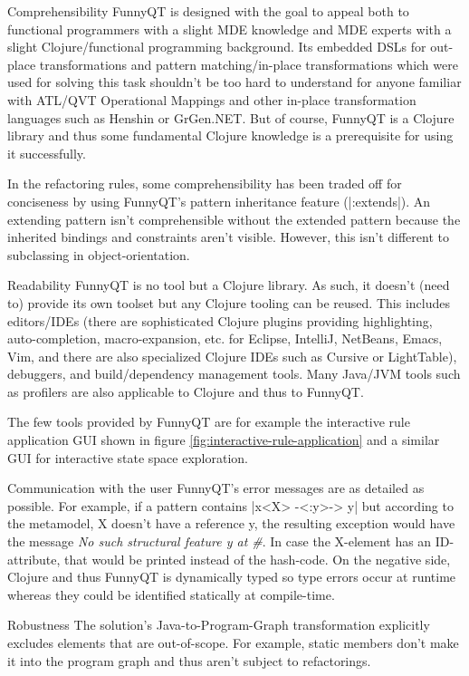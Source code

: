 \documentclass[submission]{eptcs}
\newcommand{\code}{\clojureinline}
\begin{document}
\begin{compactdesc}
\item[Comprehensibility] FunnyQT is designed with the goal to appeal both to
  functional programmers with a slight MDE knowledge and MDE experts with a
  slight Clojure/functional programming background.  Its embedded DSLs for
  out-place transformations and pattern matching/in-place transformations which
  were used for solving this task shouldn't be too hard to understand for
  anyone familiar with ATL/QVT Operational Mappings and other in-place
  transformation languages such as Henshin or GrGen.NET.  But of course,
  FunnyQT is a Clojure library and thus some fundamental Clojure knowledge is a
  prerequisite for using it successfully.

  In the refactoring rules, some comprehensibility has been traded off for
  conciseness by using FunnyQT's pattern inheritance feature (\code|:extends|).
  An extending pattern isn't comprehensible without the extended pattern
  because the inherited bindings and constraints aren't visible.  However, this
  isn't different to subclassing in object-orientation.
\item[Readability] FunnyQT is no tool but a Clojure library.  As such, it
  doesn't (need to) provide its own toolset but any Clojure tooling can be
  reused.  This includes editors/IDEs (there are sophisticated Clojure plugins
  providing highlighting, auto-completion, macro-expansion, etc. for Eclipse,
  IntelliJ, NetBeans, Emacs, Vim, and there are also specialized Clojure IDEs
  such as Cursive or LightTable), debuggers, and build/dependency management
  tools.  Many Java/JVM tools such as profilers are also applicable to Clojure
  and thus to FunnyQT.

  The few tools provided by FunnyQT are for example the interactive rule
  application GUI shown in figure \vref{fig:interactive-rule-application} and a
  similar GUI for interactive state space exploration.
\item[Communication with the user] FunnyQT's error messages are as detailed as
  possible.  For example, if a pattern contains \code|x<X> -<:y>-> y| but
  according to the metamodel, \textsf{X} doesn't have a reference \textsf{y},
  the resulting exception would have the message \emph{No such structural
    feature y at \#<X@7fa1bf>}.  In case the \textsf{X}-element has an
  ID-attribute, that would be printed instead of the hash-code.  On the
  negative side, Clojure and thus FunnyQT is dynamically typed so type errors
  occur at runtime whereas they could be identified statically at compile-time.
\item[Robustness] The solution's Java-to-Program-Graph transformation
  explicitly excludes elements that are out-of-scope.  For example, static
  members don't make it into the program graph and thus aren't subject to
  refactorings.


\end{compactdesc}
\end{document}
